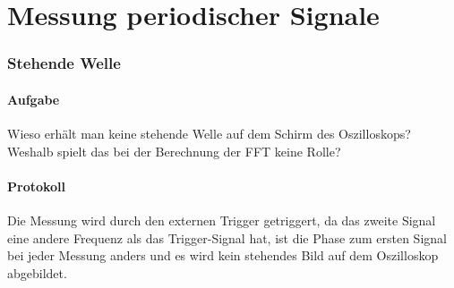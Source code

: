 \documentclass[10pt]{scrreprt}
\begin{document}
        \section{Messung periodischer Signale}

        \subsubsection{Stehende Welle}
        \paragraph{Aufgabe}
        Wieso erhält man keine stehende Welle auf dem Schirm des Oszilloskops? Weshalb
        spielt das bei der Berechnung der FFT keine Rolle?
        \paragraph{Protokoll}
        Die Messung wird durch den externen Trigger getriggert, da das zweite Signal
        eine andere Frequenz als das Trigger-Signal hat, ist die Phase zum ersten Signal
        bei jeder Messung anders und es wird kein stehendes Bild auf dem Oszilloskop
        abgebildet.
\end{document}

